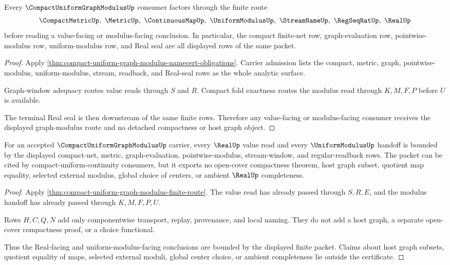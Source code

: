 \begin{theorem}
\label{thm:compact-uniform-graph-modulus-finite-route}
Every $\CompactUniformGraphModulusUp$ consumer factors through the finite route
$$
\CompactMetricUp,\ \MetricUp,\ \ContinuousMapUp,\ \UniformModulusUp,\ \StreamNameUp,\ \RegSeqRatUp,\ \RealUp
$$
before reading a value-facing or modulus-facing conclusion. In particular, the compact finite-net row, graph-evaluation row, pointwise-modulus row, uniform-modulus row, and Real seal are all displayed rows of the same packet.
\end{theorem}
\begin{proof}
Apply \autoref{thm:compact-uniform-graph-modulus-namecert-obligations}. Carrier admission lists the compact, metric, graph, pointwise-modulus, uniform-modulus, stream, readback, and Real-seal rows as the whole analytic surface.

Graph-window adequacy routes value reads through $S$ and $R$. Compact fold exactness routes the modulus read through $K,M,F,P$ before $U$ is available.

The terminal Real seal is then downstream of the same finite rows. Therefore any value-facing or modulus-facing consumer receives the displayed graph-modulus route and no detached compactness or host graph object.
\end{proof}

\begin{theorem}
\label{thm:compact-uniform-graph-modulus-real-seal}
For an accepted $\CompactUniformGraphModulusUp$ carrier, every $\RealUp$ value read and every $\UniformModulusUp$ handoff is bounded by the displayed compact-net, metric, graph-evaluation, pointwise-modulus, stream-window, and regular-readback rows. The packet can be cited by compact-uniform-continuity consumers, but it exports no open-cover compactness theorem, host graph subset, quotient map equality, selected external modulus, global choice of centers, or ambient $\RealUp$ completeness.
\end{theorem}
\begin{proof}
Apply \autoref{thm:compact-uniform-graph-modulus-finite-route}. The value read has already passed through $S,R,E$, and the modulus handoff has already passed through $K,M,F,P,U$.

Rows $H,C,Q,N$ add only componentwise transport, replay, provenance, and local naming. They do not add a host graph, a separate open-cover compactness proof, or a choice functional.

Thus the Real-facing and uniform-modulus-facing conclusions are bounded by the displayed finite packet. Claims about host graph subsets, quotient equality of maps, selected external moduli, global center choice, or ambient completeness lie outside the certificate.
\end{proof}

